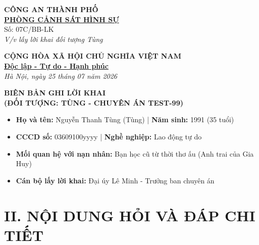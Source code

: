 \documentclass[12pt,a4paper]{article}
\begin{document}
\noindent
\begin{minipage}[t]{0.45\textwidth}
    \begin{center}
        \textbf{CÔNG AN THÀNH PHỐ}\\
        \textbf{\underline{PHÒNG CẢNH SÁT HÌNH SỰ}}\\[0.2cm]
        \small{Số: 07C/BB-LK}\\
        \textit{V/v lấy lời khai đối tượng Tùng}
    \end{center}
\end{minipage}
\hfill
\begin{minipage}[t]{0.52\textwidth}
    \begin{center}
        \textbf{CỘNG HÒA XÃ HỘI CHỦ NGHĨA VIỆT NAM}\\
        \textbf{\underline{Độc lập - Tự do - Hạnh phúc}}\\[0.2cm]
        \textit{Hà Nội, ngày 25 tháng 07 năm 2026}
    \end{center}
\end{minipage}

\vspace{0.8cm}

\begin{center}
    \textbf{\LARGE BIÊN BẢN GHI LỜI KHAI}\\
    \textbf{\large (ĐỐI TƯỢNG: TÙNG - CHUYÊN ÁN TEST-99)}
\end{center}

\vspace{0.3cm}

\begin{tcolorbox}[colback=gray!8!white,colframe=black!75!black,title=\textbf{I. THÔNG TIN NGƯỜI ĐƯỢC LẤY LỜI KHAI}]
\begin{itemize}[leftmargin=*]
    \item \textbf{Họ và tên:} Nguyễn Thanh Tùng (Tùng) | \textbf{Năm sinh:} 1991 (35 tuổi)
    \item \textbf{CCCD số:} 03609100yyyy | \textbf{Nghề nghiệp:} Lao động tự do
    \item \textbf{Mối quan hệ với nạn nhân:} Bạn học cũ từ thời thơ ấu (Anh trai của Gia Huy)
    \item \textbf{Cán bộ lấy lời khai:} Đại úy Lê Minh - Trưởng ban chuyên án
\end{itemize}
\end{tcolorbox}

\section*{II. NỘI DUNG HỎI VÀ ĐÁP CHI TIẾT}
\end{document}
